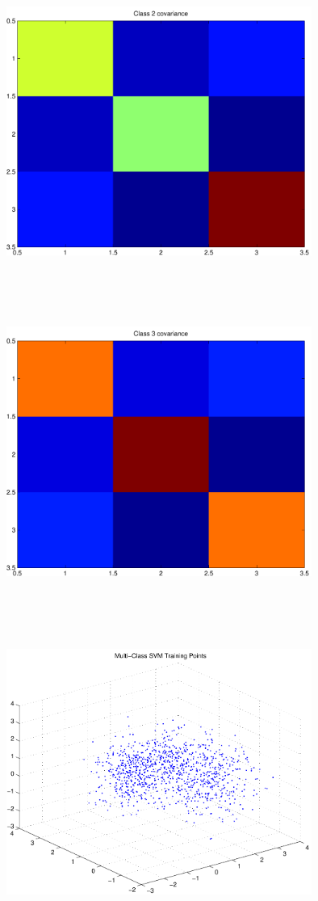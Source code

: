 \documentclass[9pt]{article}
\theoremstyle{plain}
\theoremstyle{definition}
\theoremstyle{remark}
\numberwithin{equation}{section}
\begin{document}
\includegraphics[width=10.0cm,height=10.0cm]{rv2_corr.pdf}

\includegraphics[width=10.0cm,height=10.0cm]{rv3_corr.pdf}

\includegraphics[width=10.0cm,height=10.0cm]{trainingPoints.pdf}
\end{document}
